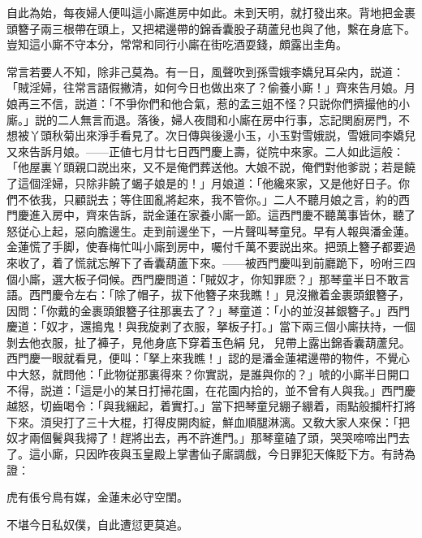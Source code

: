 自此為始，每夜婦人便叫這小廝進房中如此。未到天明，就打發出來。背地把金裹頭簪子兩三根帶在頭上，又把裙邊帶的錦香囊股子葫蘆兒也與了他，繫在身底下。豈知這小廝不守本分，常常和同行小廝在街吃酒耍錢，頗露出圭角。

常言若要人不知，除非己莫為。有一日，風聲吹到孫雪娥李嬌兒耳朵内，説道：「賊淫婦，往常言語假撇清，如何今日也做出來了？偷養小廝！」齊來告月娘。月娘再三不信，説道：「不爭你們和他合氣，惹的孟三姐不怪？只説你們擠撮他的小廝。」説的二人無言而退。落後，婦人夜間和小廝在房中行事，忘記関廚房門，不想被丫頭秋菊出來淨手看見了。次日傳與後邊小玉，小玉對雪娥説，雪娥同李嬌兒又來告訴月娘。——正値七月廿七日西門慶上壽，従院中來家。二人如此這般：「他屋裏丫頭親口説出來，又不是俺們葬送他。大娘不説，俺們對他爹説；若是饒了這個淫婦，只除非饒了蝎子娘是的！」月娘道：「他纔來家，又是他好日子。你們不依我，只顧説去；等住囬亂將起來，我不管你。」二人不聽月娘之言，約的西門慶進入房中，齊來告訴，説金蓮在家養小廝一節。這西門慶不聽萬事皆休，聽了怒従心上起，惡向膽邊生。走到前邊坐下，一片聲叫琴童兒。早有人報與潘金蓮。金蓮慌了手脚，使春梅忙叫小廝到房中，囑付千萬不要説出來。把頭上簪子都要過來收了，着了慌就忘解下了香囊葫蘆下來。——被西門慶叫到前廳跪下，吩咐三四個小廝，選大板子伺候。西門慶問道：「賊奴才，你知罪麽？」那琴童半日不敢言語。西門慶令左右：「除了帽子，拔下他簪子來我瞧！」見沒撇着金裹頭銀簪子，因問：「你戴的金裹頭銀簪子往那裏去了？」琴童道：「小的並沒甚銀簪子。」西門慶道：「奴才，還搗鬼！與我旋剥了衣服，拏板子打。」當下兩三個小廝扶持，一個剝去他衣服，扯了褲子，見他身底下穿着玉色絹𧜽兒，𧜽兒帶上露出錦香囊葫蘆兒。西門慶一眼就看見，便叫：「拏上來我瞧！」認的是潘金蓮裙邊帶的物件，不覺心中大怒，就問他：「此物従那裏得來？你實説，是誰與你的？」唬的小廝半日開口不得，説道：「這是小的某日打掃花園，在花園内拾的，並不曾有人與我。」西門慶越怒，切齒喝令：「與我綑起，着實打。」當下把琴童兒綳子綳着，雨點般攔杆打將下來。湏臾打了三十大棍，打得皮開肉綻，鮮血順腿淋漓。又敎大家人來保：「把奴才兩個鬢與我撏了！趕將出去，再不許進門。」那琴童磕了頭，哭哭啼啼出門去了。這小廝，只因昨夜與玉皇殿上掌書仙子廝調戲，今日罪犯天條貶下方。有詩為證：

\begin{myquote}
虎有倀兮鳥有媒，金蓮未必守空閨。

不堪今日私奴僕，自此遭愆更莫追。
\end{myquote}

